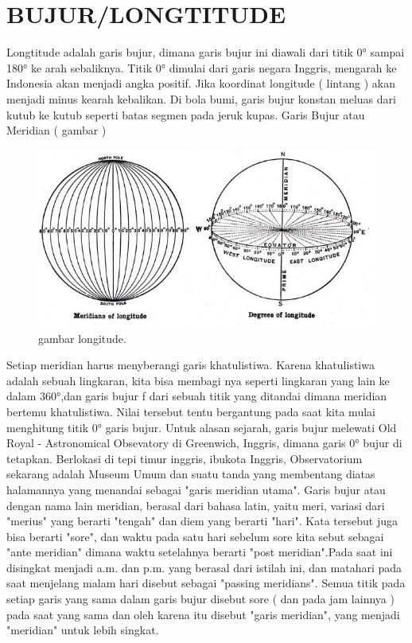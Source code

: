 \section{BUJUR/LONGTITUDE}

	Longtitude adalah garis bujur, dimana garis bujur ini diawali dari titik 0° sampai 180° ke arah sebaliknya. Titik 0° dimulai dari
	garis negara Inggris, mengarah ke Indonesia akan menjadi angka positif. Jika koordinat longitude ( lintang ) akan menjadi minus 
	kearah kebalikan. Di bola bumi, garis bujur konstan meluas dari kutub ke kutub seperti batas segmen pada jeruk kupas. Garis Bujur atau
	Meridian ( gambar )
	\begin{figure}[ht]
	\centerline{\includegraphics[width=1\textwidth]{figures/Longitude.jpg}}
	\caption{gambar longitude.}
	\label{Gambar Longitude}
	\end{figure}
	
	Setiap meridian harus menyberangi garis khatulistiwa. Karena khatulistiwa adalah sebuah lingkaran, kita bisa membagi nya seperti lingkaran
	yang lain ke dalam 360°,dan garis bujur f dari sebuah titik yang ditandai dimana meridian bertemu khatulistiwa.
	Nilai tersebut tentu bergantung pada saat kita mulai menghitung titik 0° garis bujur. Untuk alasan sejarah, garis bujur melewati Old Royal -
	Astronomical Obsevatory di Greenwich, Inggris, dimana garis 0° bujur di tetapkan. Berlokasi di tepi timur inggris, ibukota Inggris, Observatorium
	sekarang adalah Museum Umum dan suatu tanda yang membentang diatas halamannya yang menandai sebagai "garis meridian utama".
	Garis bujur atau dengan nama lain meridian, berasal dari bahasa latin, yaitu meri, variasi dari "merius" yang berarti "tengah" dan diem yang berarti 
	"hari". Kata tersebut juga bisa berarti "sore", dan waktu pada satu hari sebelum sore kita sebut sebagai "ante meridian" dimana waktu setelahnya berarti 
	"post meridian".Pada saat ini disingkat menjadi a.m. dan p.m. yang berasal dari istilah ini, dan matahari pada saat menjelang malam hari disebut sebagai
	"passing meridians". Semua titik pada setiap garis yang sama dalam garis bujur disebut sore ( dan pada jam lainnya ) pada saat yang sama dan oleh karena 
	itu disebut "garis meridian", yang menjadi "meridian" untuk lebih singkat.
